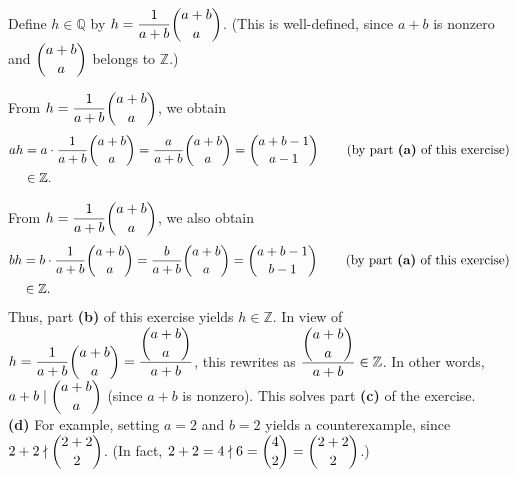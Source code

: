 \documentclass[paper=a4, fontsize=12pt]{scrartcl}%
\theoremstyle{plainsl}
\theoremstyle{definition}
\theoremstyle{remark}
\begin{document}
Define $h\in\mathbb{Q}$ by $h=\dfrac{1}{a+b}\dbinom{a+b}{a}$. (This is
well-defined, since $a+b$ is nonzero and $\dbinom{a+b}{a}$ belongs to
$\mathbb{Z}$.)

From $h=\dfrac{1}{a+b}\dbinom{a+b}{a}$, we obtain%
\begin{align*}
ah  &  =a\cdot\dfrac{1}{a+b}\dbinom{a+b}{a}=\dfrac{a}{a+b}\dbinom{a+b}%
{a}=\dbinom{a+b-1}{a-1}\qquad\left(  \text{by part \textbf{(a)} of this
exercise}\right) \\
&  \in\mathbb{Z}.
\end{align*}


From $h=\dfrac{1}{a+b}\dbinom{a+b}{a}$, we also obtain%
\begin{align*}
bh  &  =b\cdot\dfrac{1}{a+b}\dbinom{a+b}{a}=\dfrac{b}{a+b}\dbinom{a+b}%
{a}=\dbinom{a+b-1}{b-1}\qquad\left(  \text{by part \textbf{(a)} of this
exercise}\right) \\
&  \in\mathbb{Z}.
\end{align*}
Thus, part \textbf{(b)} of this exercise yields $h\in\mathbb{Z}$. In view of
$h=\dfrac{1}{a+b}\dbinom{a+b}{a}=\dfrac{\dbinom{a+b}{a}}{a+b}$, this rewrites
as $\dfrac{\dbinom{a+b}{a}}{a+b}\in\mathbb{Z}$. In other words, $a+b\mid
\dbinom{a+b}{a}$ (since $a+b$ is nonzero). This solves part \textbf{(c)} of
the exercise. \\[0.4cm]

\textbf{(d)} For example, setting $a=2$ and $b=2$ yields a counterexample,
since $2+2\nmid\dbinom{2+2}{2}$. (In fact, $2+2=4\nmid6=\dbinom{4}{2}%
=\dbinom{2+2}{2}$.)
\end{document}
